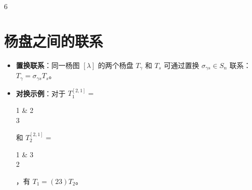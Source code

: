 \documentclass[landscape]{article}
\renewcommand{\normalsize}{\fontsize{5pt}{8pt}\selectfont}
\begin{document}
\begin{multicols*}{6}
    
    
    
\section*{杨盘之间的联系}
\begin{itemize}
    \item \textbf{置换联系}：同一杨图 $[\lambda]$ 的两个杨盘 $T_\gamma$ 和 $T_s$ 可通过置换 $\sigma_{\gamma s} \in S_n$ 联系：$T_\gamma = \sigma_{\gamma s} T_s$。
    \item \textbf{对换示例}：对于 $T_1^{[2,1]} =$ \tiny\begin{ytableau}1 & 2 \\ 3\end{ytableau} 
    和 $T_2^{[2,1]} =$ \tiny\begin{ytableau}1 & 3 \\ 2\end{ytableau}，有 $T_1 = (23) T_2$。
\end{itemize}


\end{multicols*}
\end{document}

